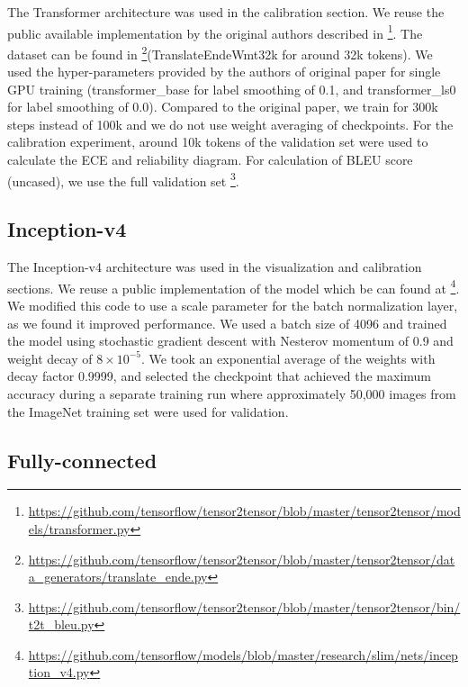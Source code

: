 \documentclass{article}
\begin{document}
The Transformer architecture was used in the calibration section. We reuse the public available implementation by the original authors described in \footnote{\scriptsize\url{https://github.com/tensorflow/tensor2tensor/blob/master/tensor2tensor/models/transformer.py}}. The dataset can be found in \footnote{\scriptsize\url{https://github.com/tensorflow/tensor2tensor/blob/master/tensor2tensor/data_generators/translate_ende.py}}(TranslateEndeWmt32k for around 32k tokens). We used the hyper-parameters provided by the authors of original paper for single GPU training (transformer\_base for label smoothing of 0.1, and transformer\_ls0 for label smoothing of 0.0). Compared to the original paper, we train for 300k steps instead of 100k and we do not use weight averaging of checkpoints. For the calibration experiment, around 10k tokens of the validation set were used to calculate the ECE and reliability diagram. For calculation of BLEU score (uncased), we use the full validation set \footnote{\scriptsize\url{https://github.com/tensorflow/tensor2tensor/blob/master/tensor2tensor/bin/t2t_bleu.py}}.

\subsection{Inception-v4}

The Inception-v4 architecture was used in the visualization and calibration sections. We reuse a public implementation of the model which be can found at \footnote{\scriptsize\url{https://github.com/tensorflow/models/blob/master/research/slim/nets/inception_v4.py}}. We modified this code to use a scale parameter for the batch normalization layer, as we found it improved performance. We used a batch size of 4096 and trained the model using stochastic gradient descent with Nesterov momentum of 0.9 and weight decay of $8 \times 10^{-5}$. We took an exponential average of the weights with decay factor 0.9999, and selected the checkpoint that achieved the maximum accuracy during a separate training run where approximately 50,000 images from the ImageNet training set were used for validation.

\subsection{Fully-connected}
\end{document}
